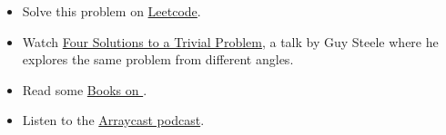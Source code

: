 \documentclass{article}
\begin{document}
\begin{itemize}
  \item Solve this problem on \href{https://leetcode.com/problems/trapping-rain-water/}{Leetcode}.
  \item Watch \href{https://youtu.be/ftcIcn8AmSY}{Four Solutions to a Trivial Problem}, a talk by Guy Steele where he explores the same problem from different angles.
  \item Read some \href{https://code.jsoftware.com/wiki/Books}{Books on }.
  \item Listen to the \href{https://arraycast.com/}{Arraycast podcast}.
\end{itemize}
\end{document}
